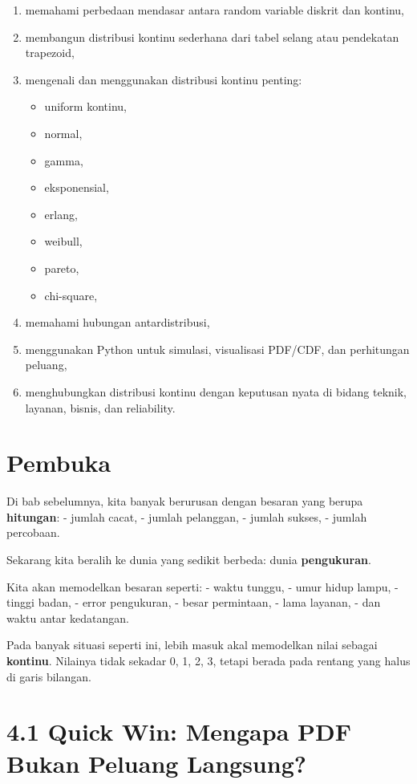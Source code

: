 \documentclass[
  letterpaper,
  DIV=11,
  numbers=noendperiod]{scrreprt}
\providecommand{\tightlist}{%
  \setlength{\itemsep}{0pt}\setlength{\parskip}{0pt}}
\begin{document}
\begin{enumerate}
\def\labelenumi{\arabic{enumi}.}
\tightlist
\item
  memahami perbedaan mendasar antara random variable diskrit dan
  kontinu,
\item
  membangun distribusi kontinu sederhana dari tabel selang atau
  pendekatan trapezoid,
\item
  mengenali dan menggunakan distribusi kontinu penting:

  \begin{itemize}
  \tightlist
  \item
    uniform kontinu,
  \item
    normal,
  \item
    gamma,
  \item
    eksponensial,
  \item
    erlang,
  \item
    weibull,
  \item
    pareto,
  \item
    chi-square,
  \end{itemize}
\item
  memahami hubungan antardistribusi,
\item
  menggunakan Python untuk simulasi, visualisasi PDF/CDF, dan
  perhitungan peluang,
\item
  menghubungkan distribusi kontinu dengan keputusan nyata di bidang
  teknik, layanan, bisnis, dan reliability.
\end{enumerate}

\section{Pembuka}\label{pembuka-3}

Di bab sebelumnya, kita banyak berurusan dengan besaran yang berupa
\textbf{hitungan}: - jumlah cacat, - jumlah pelanggan, - jumlah sukses,
- jumlah percobaan.

Sekarang kita beralih ke dunia yang sedikit berbeda: dunia
\textbf{pengukuran}.

Kita akan memodelkan besaran seperti: - waktu tunggu, - umur hidup
lampu, - tinggi badan, - error pengukuran, - besar permintaan, - lama
layanan, - dan waktu antar kedatangan.

Pada banyak situasi seperti ini, lebih masuk akal memodelkan nilai
sebagai \textbf{kontinu}. Nilainya tidak sekadar 0, 1, 2, 3, tetapi
berada pada rentang yang halus di garis bilangan.

\section{4.1 Quick Win: Mengapa PDF Bukan Peluang
Langsung?}\label{quick-win-mengapa-pdf-bukan-peluang-langsung}
\end{document}
